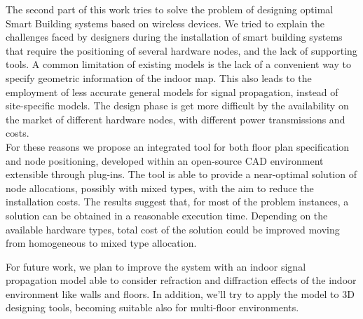 The second part of this work tries to solve the problem of designing optimal Smart Building systems based on wireless devices. We tried to explain the challenges faced by designers during the installation of smart building systems that require the positioning of several hardware nodes, and the lack of supporting tools. A common limitation of existing models is the lack of a convenient way to specify geometric information of the indoor map. This also leads to the employment of less accurate general models for signal propagation, instead of site-specific models. The design phase is get more difficult by the availability on the market of different hardware nodes, with different power transmissions and costs.\\
For these reasons we propose an integrated tool for both floor plan specification and node positioning, developed within an \mbox{open-source} CAD environment extensible through plug-ins. The tool is able to provide a near-optimal solution of node allocations, possibly with mixed types, with the aim to reduce the installation costs. The results suggest that, for most of the problem instances, a solution can be obtained in a reasonable execution time. Depending on the available hardware types, total cost of the solution could be improved moving from homogeneous to mixed type allocation.

For future work, we plan to improve the system with an indoor signal propagation model able to consider refraction and diffraction effects of the indoor environment like walls and floors. In addition, we'll try to apply the model to 3D designing tools, becoming suitable also for multi-floor environments.
%
